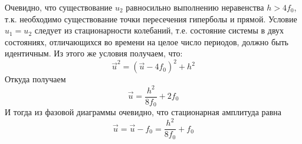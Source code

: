 \documentclass[12pt,a4paper]{article}
\begin{document}
\par Очевидно, что существование $u_{2}$ равносильно выполнению неравенства $h > 4f_{0}$, т.к. необходимо существование точки пересечения гиперболы и прямой. Условие $u_{1} = u_{2}$ следует из стационарности колебаний, т.е. состояние системы в двух состояниях, отличающихся во времени на целое число периодов, должно быть идентичным. Из этого же условия получаем, что:
\begin{equation}
\vec{u}^{2} = (\vec{u} - 4f_{0})^{2} + h^{2}
\end{equation}  
Откуда получаем 
\begin{equation}
\vec{u} = \frac{h^{2}}{8f_{0}} + 2f_{0}
\end{equation}
И тогда из фазовой диаграммы очевидно, что стационарная амплитуда равна
\begin{equation}
\vec{u} = \vec{u} - f_{0} = \frac{h^2}{8f_{0}} + f_{0}
\end{equation}
\end{document}
